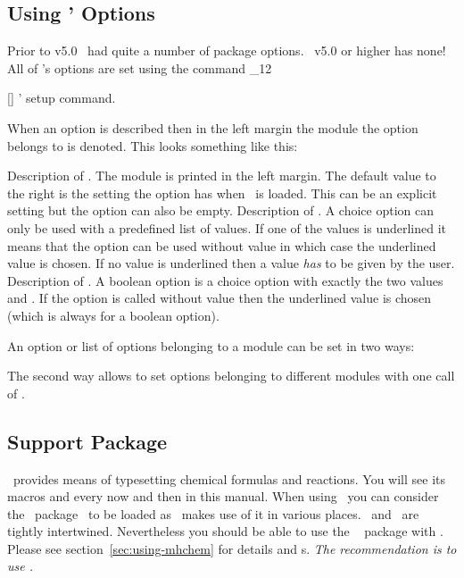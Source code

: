 \documentclass[load-preamble+]{cnltx-doc}
\makeatletter
\def\chemmodule*#1{\textquotedblleft#1\textquotedblright}%
\renewenvironment{commands}
  {%
    \cnltx@set@catcode_{12}%
    \let\command\cnltx@command
    \cnltxlist
  }
  {\endcnltxlist}
\makeatother
\begin{document}
\subsection{Using \chemmacros' Options}\label{sec:using-chemm-opti}
Prior to v5.0 \chemmacros\ had quite a number of package options.
\chemmacros\ v5.0 or higher has none!  All of \chemmacros's options are set
using the command
\begin{commands}
  \command{chemsetup}[]
    \chemmacros' setup command.
\end{commands}

When an option is described then in the left margin the module the option
belongs to is denoted.  This looks something like this:
\begin{options}
  \Default
    Description of . The module is printed in the left margin.
    The default value to the right is the setting the option has when
    \chemmacros\ is loaded.  This can be an explicit setting but the option
    can also be empty.
    Description of .  A choice option can only be used
    with a predefined list of values. If one of the values is underlined it
    means that the option can be used without value in which case the
    underlined value is chosen.  If no value is underlined then a value
    \emph{has} to be given by the user.
    Description of .  A boolean option is a choice
    option with exactly the two values  and .  If the
    option is called without value then the underlined value is chosen (which
    is always  for a boolean option).
\end{options}

An option or list of options belonging to a module  can be
set in two ways:
\begin{sourcecode}
\end{sourcecode}
The second way allows to set options belonging to different modules with one
call of .

\subsection{Support Package \chemformula}
\chemformula\ provides means of typesetting chemical formulas and reactions.
You will see its macros  and  every now and then in this
manual.  When using \chemmacros\ you can consider the \chemformula\
package~\cite{pkg:chemformula} to be loaded as \chemmacros\ makes use of it in
various places.  \chemmacros\ and \chemformula\ are tightly intertwined.
Nevertheless you should be able to use the \pkg{mhchem}~\cite{pkg:mhchem}
package with \chemmacros. Please see section~\vref{sec:using-mhchem} for
details and \latin{caveat}s.  \emph{The recommendation is to use
  \chemformula.}
\end{document}
